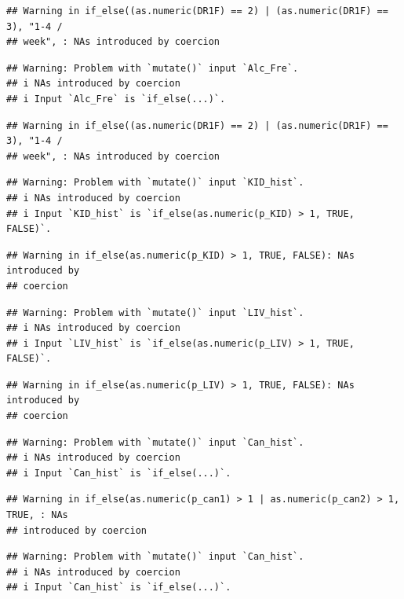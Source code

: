 \documentclass[
]{article}
\begin{document}
\begin{verbatim}
## Warning in if_else((as.numeric(DR1F) == 2) | (as.numeric(DR1F) == 3), "1-4 /
## week", : NAs introduced by coercion
\end{verbatim}

\begin{verbatim}
## Warning: Problem with `mutate()` input `Alc_Fre`.
## i NAs introduced by coercion
## i Input `Alc_Fre` is `if_else(...)`.
\end{verbatim}

\begin{verbatim}
## Warning in if_else((as.numeric(DR1F) == 2) | (as.numeric(DR1F) == 3), "1-4 /
## week", : NAs introduced by coercion
\end{verbatim}

\begin{verbatim}
## Warning: Problem with `mutate()` input `KID_hist`.
## i NAs introduced by coercion
## i Input `KID_hist` is `if_else(as.numeric(p_KID) > 1, TRUE, FALSE)`.
\end{verbatim}

\begin{verbatim}
## Warning in if_else(as.numeric(p_KID) > 1, TRUE, FALSE): NAs introduced by
## coercion
\end{verbatim}

\begin{verbatim}
## Warning: Problem with `mutate()` input `LIV_hist`.
## i NAs introduced by coercion
## i Input `LIV_hist` is `if_else(as.numeric(p_LIV) > 1, TRUE, FALSE)`.
\end{verbatim}

\begin{verbatim}
## Warning in if_else(as.numeric(p_LIV) > 1, TRUE, FALSE): NAs introduced by
## coercion
\end{verbatim}

\begin{verbatim}
## Warning: Problem with `mutate()` input `Can_hist`.
## i NAs introduced by coercion
## i Input `Can_hist` is `if_else(...)`.
\end{verbatim}

\begin{verbatim}
## Warning in if_else(as.numeric(p_can1) > 1 | as.numeric(p_can2) > 1, TRUE, : NAs
## introduced by coercion
\end{verbatim}

\begin{verbatim}
## Warning: Problem with `mutate()` input `Can_hist`.
## i NAs introduced by coercion
## i Input `Can_hist` is `if_else(...)`.
\end{verbatim}
\end{document}
